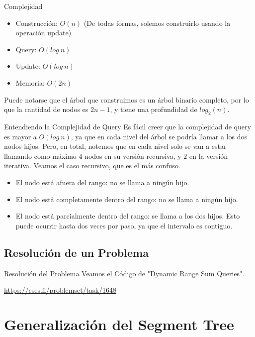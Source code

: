 \documentclass{beamer}
\begin{document}
\begin{frame}{Complejidad}
\begin{itemize}
    \item Construcción: $O(n)$ (De todas formas, solemos construirlo usando la operación update)
    \item Query: $O(log\:n)$
    \item Update: $O(log\:n)$
    \item Memoria: $O(2n)$
\end{itemize}
Puede notarse que el árbol que construimos es un árbol binario completo, por lo que la cantidad de nodos es $2n-1$, y tiene una profundidad de $log_2(n)$.
\end{frame}

\begin{frame}{Entendiendo la Complejidad de Query}
Es fácil creer que la complejidad de query es mayor a $O(log\:n)$, ya que en cada nivel del árbol se podría llamar a los dos nodos hijos. Pero, en total, notemos que en cada nivel solo se van a estar llamando como máximo $4$ nodos en su versión recursiva, y $2$ en la versión iterativa. Veamos el caso recursivo, que es el más confuso.

\begin{itemize}
    \item El nodo está afuera del rango: no se llama a ningún hijo.
    \item El nodo está completamente dentro del rango: no se llama a ningún hijo.
    \item El nodo está parcialmente dentro del rango: se llama a los dos hijos. Esto puede ocurrir hasta dos veces por paso, ya que el intervalo es contiguo.
\end{itemize}
\end{frame}

\subsection{Resolución de un Problema}

\begin{frame}{Resolución del Problema}
Veamos el Código de "Dynamic Range Sum Queries".

\url{https://cses.fi/problemset/task/1648}
\end{frame}

\section{Generalización del Segment Tree}
\end{document}
